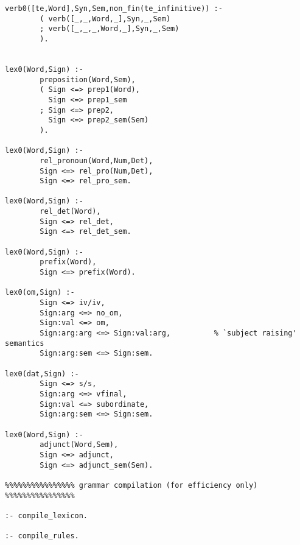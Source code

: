 \begin{verbatim}
verb0([te,Word],Syn,Sem,non_fin(te_infinitive)) :- 
        ( verb([_,_,Word,_],Syn,_,Sem)
        ; verb([_,_,_,Word,_],Syn,_,Sem)
        ).

        
lex0(Word,Sign) :-
        preposition(Word,Sem),
        ( Sign <=> prep1(Word),
          Sign <=> prep1_sem
        ; Sign <=> prep2,
          Sign <=> prep2_sem(Sem)
        ). 
        
lex0(Word,Sign) :-
        rel_pronoun(Word,Num,Det),
        Sign <=> rel_pro(Num,Det),
        Sign <=> rel_pro_sem.

lex0(Word,Sign) :-
        rel_det(Word),
        Sign <=> rel_det,
        Sign <=> rel_det_sem.

lex0(Word,Sign) :-
        prefix(Word),
        Sign <=> prefix(Word).

lex0(om,Sign) :-
        Sign <=> iv/iv,
        Sign:arg <=> no_om,
        Sign:val <=> om,
        Sign:arg:arg <=> Sign:val:arg,          % `subject raising' semantics
        Sign:arg:sem <=> Sign:sem.              
        
lex0(dat,Sign) :-
        Sign <=> s/s,
        Sign:arg <=> vfinal,
        Sign:val <=> subordinate,
        Sign:arg:sem <=> Sign:sem.              
        
lex0(Word,Sign) :-
        adjunct(Word,Sem),                      
        Sign <=> adjunct,
        Sign <=> adjunct_sem(Sem).      
        
%%%%%%%%%%%%%%%% grammar compilation (for efficiency only) %%%%%%%%%%%%%%%%
        
:- compile_lexicon.

:- compile_rules.
\end{verbatim}
